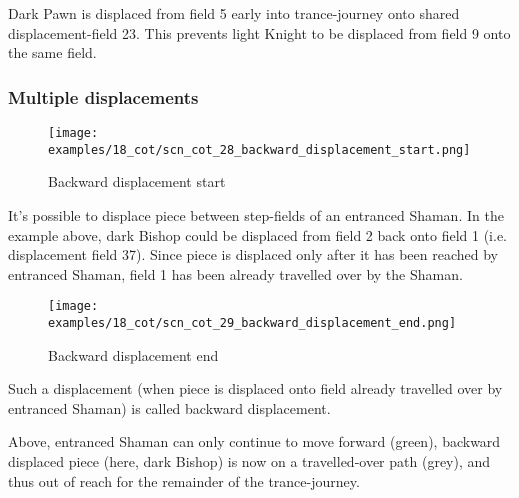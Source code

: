 Dark Pawn is displaced from field 5 early into trance-journey onto shared displacement-field
23. This prevents light Knight to be displaced from field 9 onto the same field.

\clearpage %

\subsubsection*{Multiple displacements}

\noindent
\begin{figure}[!h]
\vspace{-1.0\baselineskip}
\texttt{[image: examples/18\_cot/scn\_cot\_28\_backward\_displacement\_start.png]}
\caption{Backward displacement start}
\label{fig:scn_cot_28_backward_displacement_start}
\end{figure}

It's possible to displace piece between step-fields of an entranced Shaman. In the example
above, dark Bishop could be displaced from field 2 back onto field 1 (i.e. displacement
field 37). Since piece is displaced only after it has been reached by entranced Shaman,
field 1 has been already travelled over by the Shaman.

\clearpage %

\noindent
\begin{figure}[!h]
\texttt{[image: examples/18\_cot/scn\_cot\_29\_backward\_displacement\_end.png]}
\caption{Backward displacement end}
\label{fig:scn_cot_29_backward_displacement_end}
\end{figure}

Such a displacement (when piece is displaced onto field already travelled over
by entranced Shaman) is called backward displacement.

Above, entranced Shaman can only continue to move forward (green), backward displaced
piece (here, dark Bishop) is now on a travelled-over path (grey), and thus out of reach
for the remainder of the trance-journey.

\clearpage %

